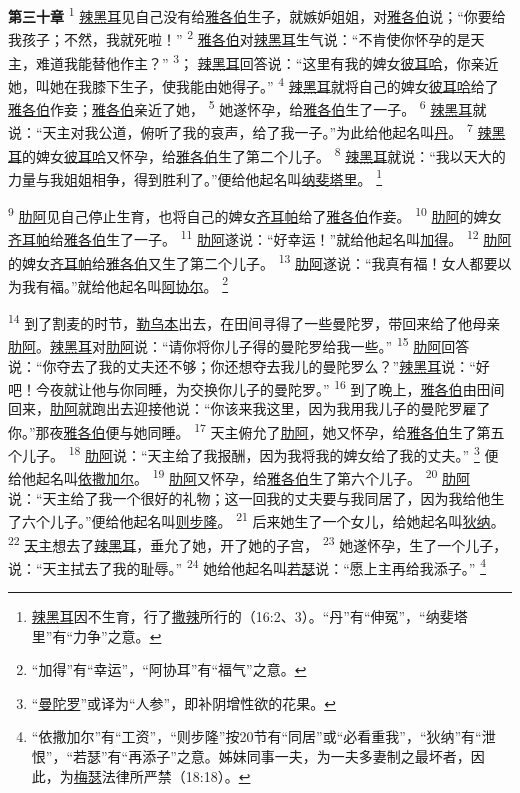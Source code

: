 \textbf{第三十章\quad}
\textsuperscript{1}
\uline{辣黑耳}见自己没有给\uline{雅各伯}生子，就嫉妒姐姐，对\uline{雅各伯}说；“你要给我孩子；不然，我就死啦！”
\textsuperscript{2}
\uline{雅各伯}对\uline{辣黑耳}生气说：“不肯使你怀孕的是天主，难道我能替他作主？”
\textsuperscript{3}；
\uline{辣黑耳}回答说：“这里有我的婢女\uline{彼耳哈}，你亲近她，叫她在我膝下生子，使我能由她得子。”
\textsuperscript{4}
\uline{辣黑耳}就将自己的婢女\uline{彼耳哈}给了\uline{雅各伯}作妾；\uline{雅各伯}亲近了她，
\textsuperscript{5}
她遂怀孕，给\uline{雅各伯}生了一子。
\textsuperscript{6}
\uline{辣黑耳}就说：“天主对我公道，俯听了我的哀声，给了我一子。”为此给他起名叫\uline{丹}。
\textsuperscript{7}
\uline{辣黑耳}的婢女\uline{彼耳哈}又怀孕，给\uline{雅各伯}生了第二个儿子。
\textsuperscript{8}
\uline{辣黑耳}就说：“我以天大的力量与我姐姐相争，得到胜利了。”便给他起名叫\uline{纳斐塔里}。
\footnote{\uline{辣黑耳}因不生育，行了\uline{撒辣}所行的（16:2、3）。“丹”有“伸冤”，“纳斐塔里”有“力争”之意。}

\textsuperscript{9}
\uline{肋阿}见自己停止生育，也将自己的婢女\uline{齐耳帕}给了\uline{雅各伯}作妾。
\textsuperscript{10}
\uline{肋阿}的婢女\uline{齐耳帕}给\uline{雅各伯}生了一子。
\textsuperscript{11}
\uline{肋阿}遂说：“好幸运！”就给他起名叫\uline{加得}。
\textsuperscript{12}
\uline{肋阿}的婢女\uline{齐耳帕}给\uline{雅各伯}又生了第二个儿子。
\textsuperscript{13}
\uline{肋阿}遂说：“我真有福！女人都要以为我有福。”就给他起名叫\uline{阿协尔}。
\footnote{“加得”有“幸运”，“阿协耳”有“福气”之意。}

\textsuperscript{14}
到了割麦的时节，\uline{勒乌本}出去，在田间寻得了一些曼陀罗，带回来给了他母亲\uline{肋阿}。\uline{辣黑耳}对\uline{肋阿}说：“请你将你儿子得的曼陀罗给我一些。”
\textsuperscript{15}
\uline{肋阿}回答说：“你夺去了我的丈夫还不够；你还想夺去我儿的曼陀罗么？”\uline{辣黑耳}说：“好吧！今夜就让他与你同睡，为交换你儿子的曼陀罗。”
\textsuperscript{16}
到了晚上，\uline{雅各伯}由田间回来，\uline{肋阿}就跑出去迎接他说：“你该来我这里，因为我用我儿子的曼陀罗雇了你。”那夜\uline{雅各伯}便与她同睡。
\textsuperscript{17}
天主俯允了\uline{肋阿}，她又怀孕，给\uline{雅各伯}生了第五个儿子。
\textsuperscript{18}
\uline{肋阿}说：“天主给了我报酬，因为我将我的婢女给了我的丈夫。”
\footnote{“\uline{曼陀罗}”或译为“人参”，即补阴增性欲的花果。}
便给他起名叫\uline{依撒}\uline{加尔}。
\textsuperscript{19}
\uline{肋阿}又怀孕，给\uline{雅各伯}生了第六个儿子。
\textsuperscript{20}
\uline{肋阿}说：“天主给了我一个很好的礼物；这一回我的丈夫要与我同居了，因为我给他生了六个儿子。”便给他起名叫\uline{则步隆}。
\textsuperscript{21}
后来她生了一个女儿，给她起名叫\uline{狄纳}。
\textsuperscript{22}
\uline{天主}想去了\uline{辣黑耳}，垂允了她，开了她的子宫，
\textsuperscript{23}
她遂怀孕，生了一个儿子，说：“天主拭去了我的耻辱。”
\textsuperscript{24}
她给他起名叫\uline{若瑟}说：“愿上主再给我添子。”
\footnote{“依撒加尔”有“工资”，“则步隆”按20节有“同居”或“必看重我”，“狄纳”有“泄恨”，“若瑟”有“再添子”之意。姊妹同事一夫，为一夫多妻制之最坏者，因此，为\uline{梅瑟}法律所严禁（18:18）。}

